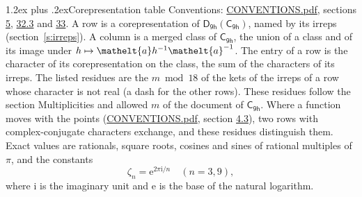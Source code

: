\documentclass[10pt,a4paper]{article}
\makeatletter
\renewcommand\section{\@startsection{section}{1}{\z@}{-3ex plus -1ex minus -.2ex}%
  {1.2ex plus .2ex}{\normalfont\large\sffamily\bfseries\color{parttitle}}}
\numberwithin{equation}{section}
\newcommand{\eltfont}[1]{{\let\sigma\eltsigma\mathelt{#1}}}
\newcommand{\grp}[1]{\mathsf{#1}}
\newcommand{\elt}[1]{\eltfont{#1}}
\newcommand{\iunit}{\mathrm{i}}
\newcommand{\expe}{\mathrm{e}}
\newcommand{\rootunity}[1]{\zeta_{#1}}
\makeatother
\begin{document}
\section{Corepresentation table}\label{s:character_table}
Conventions: \href{../../CONVENTIONS.pdf}{CONVENTIONS.pdf}, sections \href{../../../rotation/CONVENTIONS.pdf\#conv.5}{5}, \href{../../CONVENTIONS.pdf\#conv.32.3}{32.3} and \href{../../CONVENTIONS.pdf\#conv.33}{33}.
A row is a corepresentation of $\grp{D_{9h}}(\grp{C_{9h}})$, named by its irreps (section~\ref{s:irreps}). A column is a merged class of $\grp{C_{9h}}$, the union of a class and of its image under $h \mapsto \elt{a} h^{-1} \elt{a}^{-1}$. The entry of a row is the character of its corepresentation on the class, the sum of the characters of its irreps.
\leavevmode\label{n:head.parity}The listed residues are the $m \bmod 18$ of the kets of the irreps of a row whose character is not real (a dash for the other rows). These residues follow the section Multiplicities and allowed $m$ of the document of \href{../../../rotation/data/pdf/C9h.pdf}{$\grp{C_{9h}}$}. Where a function moves with the points (\href{../../CONVENTIONS.pdf}{CONVENTIONS.pdf}, section \href{../../../rotation/CONVENTIONS.pdf\#conv.4.3}{4.3}), two rows with complex-conjugate characters exchange, and these residues distinguish them.
\leavevmode\label{n:constant.root}\label{n:index.root.order}Exact values are rationals, square roots, cosines and sines of rational multiples of $\pi$, and the constants
\begin{equation}\label{e:constants}\rootunity{n} = \expe^{2\pi\iunit/n}\quad(n = 3, 9),\end{equation}
where $\iunit$ is the imaginary unit and $\expe$ is the base of the natural logarithm.
\end{document}
